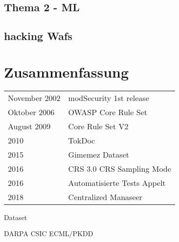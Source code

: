 \subsection{Thema 2 - ML}


\subsection{hacking Wafs}


\section{Zusammenfassung}


\begin{tabular}{ll}
  November 2002 & modSecurity 1st release \\
  Oktober 2006 & OWASP Core Rule Set \\
  August 2009 & Core Rule Set V2 \\
  2010 & TokDoc \\
  2015 & Gimemez Dataset \\
  2016 & CRS 3.0 CRS Sampling Mode \\
  2016 & Automatisierte Tests Appelt \\
  2018 & Centralized Manaseer\\
\end{tabular}

Dataset

DARPA
CSIC
ECML/PKDD